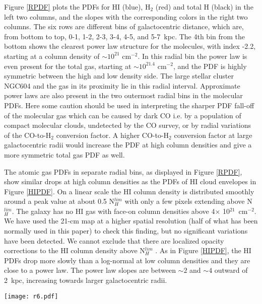 \documentclass{aa}
\begin{document}
Figure \ref{RPDF} plots the PDFs for HI (blue), H$_2$ (red) and total H
(black) in the left two columns, and the slopes with the corresponding colors in
the right two columns. The six rows are different bins of galactocentric distance,
which are, from bottom to top, 0-1, 1-2, 2-3, 3-4, 4-5, and 5-7~kpc.  The 4th bin
from the bottom shows the clearest power law structure for the molecules, with index -2.2,
starting at a column density of $\sim10^{21}$ cm$^{-2}$. In this radial bin the power law is even 
present for the total gas, starting at $\sim10^{21.4}$ cm$^{-2}$, and  the PDF is
highly symmetric between the high and low density side. The large stellar cluster NGC604
and the gas in its proximity lie in this radial interval.
Approximate power laws are also present in the two outermost  radial bins
in the molecular PDFs.  Here
some caution should be used in interpreting the sharper PDF fall-off  of the molecular gas
which can be caused by dark CO i.e. by a population of compact molecular clouds, 
undetected by the CO survey, or by radial variations of the
CO-to-H$_2$ conversion factor. A higher CO-to-H$_2$ conversion factor at large
galactocentric radii would increase
the PDF at high column densities and give a more symmetric total gas PDF as well.

The atomic gas PDFs in separate radial bins, as displayed in Figure \ref{RPDF}, show similar drops  
at high column densities as  the PDFs of HI cloud envelopes in Figure \ref{HIPDF}. 
On a linear scale the HI column density is distributed smoothly around a peak
value at about 0.5 N$_H^{lim}$ with only a few pixels extending above N$_H^{lim}$.
The galaxy has no HI gas with face-on column densities above 
4$\times$ 10$^{21}$~cm$^{-2}$. We have  used the 21-cm map at a higher spatial
resolution (half of what has been normally used in this paper)
to check this finding, but no  significant variations have been detected. 
We cannot exclude that there are localized opacity corrections to the  HI column density above
N$_H^{lim}$ \citep{2009ApJ...695..937B,2012ApJ...749...87B}.
As in Figure \ref{HIPDF}, the HI PDFs drop more slowly than a log-normal at 
low column densities and they are close to a
power law. The power law slopes are between $\sim2$ and $\sim4$ outward of 2~kpc,
increasing towards larger galactocentric radii.

\begin{figure*}
\centering
\texttt{[image: r6.pdf]}
\caption{The PDFs (left) and PDF slopes (right)
of the atomic (blue), molecular (red) and total (black)
hydrogen gas in 6 radial bins increasing
from the bottom to top and separated by 1 kpc intervals for all but the top row,
where the radial interval is 2 kpc. The label in the upper left corner of the leftmost panels
indicate the radial boundaries of each bin in kpc.
Each PDF has been normalized to their peak value.
  The 4th bin from the bottom (radius 3-4 kpc)
has a clear power-law structure in the molecules and total gas. }
\label{RPDF}
\end{figure*}
\end{document}
